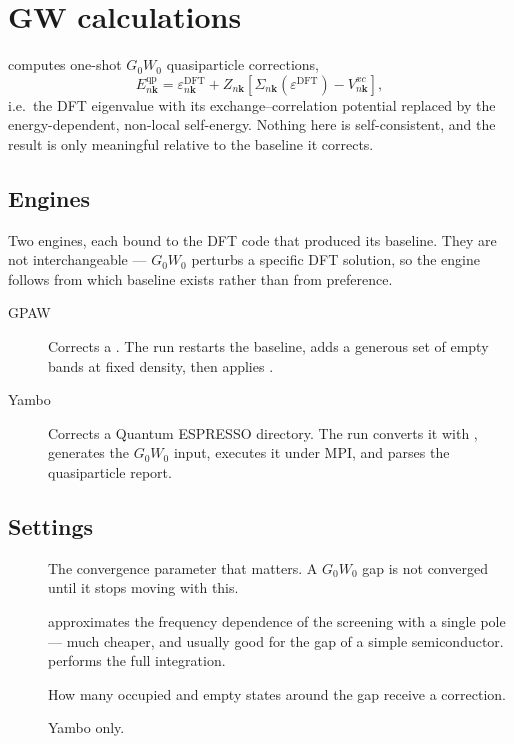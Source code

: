 \section{GW calculations}
\label{sec:gw}

\menusep{} computes one-shot
$G_0W_0$ quasiparticle corrections,
\[
  E^{\text{qp}}_{n\mathbf{k}} = \varepsilon^{\text{DFT}}_{n\mathbf{k}}
  + Z_{n\mathbf{k}}\left[\Sigma_{n\mathbf{k}}(\varepsilon^{\text{DFT}})
  - V^{xc}_{n\mathbf{k}}\right],
\]
i.e.\ the DFT eigenvalue with its exchange--correlation potential replaced by
the energy-dependent, non-local self-energy. Nothing here is self-consistent,
and the result is only meaningful relative to the baseline it corrects.

\subsection{Engines}

Two engines, each bound to the DFT code that produced its baseline. They are
not interchangeable --- $G_0W_0$ perturbs a specific DFT solution, so the
engine follows from which baseline exists rather than from preference.

\begin{description}
  \item[GPAW] Corrects a . The run restarts the baseline, adds a
    generous set of empty bands at fixed density, then applies
    .
  \item[Yambo] Corrects a Quantum ESPRESSO  directory. The run
    converts it with , generates the $G_0W_0$ input, executes it under
    MPI, and parses the quasiparticle report.
\end{description}

\subsection{Settings}

\begin{description}
  \item[] The convergence parameter that matters. A
    $G_0W_0$ gap is not converged until it stops moving with this.
  \item[]  approximates the frequency
    dependence of the screening with a single pole --- much cheaper, and
    usually good for the gap of a simple semiconductor.  performs
    the full integration.
  \item[] How many occupied and empty states around the
    gap receive a correction.
  \item[] Yambo only.
\end{description}

